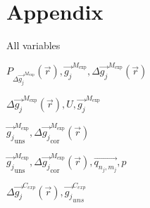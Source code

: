 \documentclass[12pt, titlepage]{article}
\begin{document}
\newpage

\section{Appendix} \label{Appendix}


All variables

$P_{\Delta \overrightarrow{g_{j}}^{M_{\text{exp}}}}(\vec{r}), \overrightarrow{g_{j}}^{M_{\text{exp}}}, \Delta \overrightarrow{g_{j}}^{M_{\text{exp}}}(\vec{r})$

$\Delta \overrightarrow{g_{j}}^{M_{\text{exp}}}(\vec{r}),U,\overrightarrow{g_{j}}^{M_{\text{exp}}}$

$\overrightarrow{g_{j}}_{\text{uns}}^{M_{\text{exp}}}, \Delta\overrightarrow{g_{j}}_{\text{cor}}^{M_{\text{exp}}}(\vec{r})$

$\overrightarrow{g_{j}}_{\text{uns}}^{M_{\text{exp}}},\Delta\overrightarrow{g_{j}}_{\text{cor}}^{M_{\text{exp}}}(\vec{r}),\overrightarrow{q_{n_j,m_j}},p$

$\Delta \overrightarrow{g_{j}}^{C_{exp}}(\vec{r}),\overrightarrow{g_{j}}_{uns}^{C_{exp}}$
\end{document}
